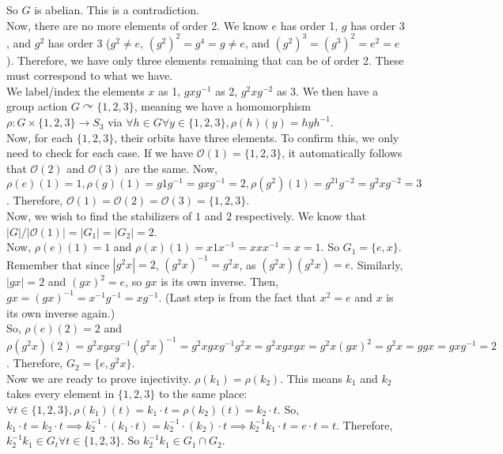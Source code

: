 \documentclass{amsart}
\begin{document}
\begin{enumerate}
\begin{enumerate}
    So $G$ is abelian. This is a contradiction.\\

    Now, there are no more elements of order 2. We know $e$ has order 1, $g$ has order $3$, and $g^2$ has order 3 ($g^2\neq e$, $(g^2)^2=g^4=g\neq e$, and $(g^2)^3=(g^3)^2=e^2=e$). Therefore, we have only three elements remaining that can be of order 2. These must correspond to what we have.\\

    We label/index the elements $x$ as 1, $gxg^{-1}$ as 2, $g^2xg^{-2}$ as 3. We then have a group action $G\curvearrowright\{1,2,3\}$, meaning we have a homomorphism $\rho:G\times\{1,2,3\}\to S_3$ via $\forall h\in G\forall y\in\{1,2,3\},\rho(h)(y)=hyh^{-1}$.\\

    Now, for each $\{1,2,3\}$, their orbits have three elements. To confirm this, we only need to check for each case. If we have $\mathcal{O}(1)=\{1,2,3\}$, it automatically follows that $\mathcal{O}(2)$ and $\mathcal{O}(3)$ are the same. Now, $\rho(e)(1)=1,\rho(g)(1)=g1g^{-1}=gxg^{-1}=2,\rho(g^2)(1)=g^21g^{-2}=g^2xg^{-2}=3$. Therefore, $\mathcal{O}(1)=\mathcal{O}(2)=\mathcal{O}(3)=\{1,2,3\}$.\\

    Now, we wish to find the stabilizers of $1$ and $2$ respectively. We know that $|G|/|\mathcal O(1)|=|G_1|=|G_2|=2$.\\

    Now, $\rho(e)(1)=1$ and $\rho(x)(1)=x1x^{-1}=xxx^{-1}=x=1$. So $G_1=\{e,x\}$.\\

    Remember that since $|g^2x|=2$, $(g^2x)^{-1}=g^2x$, as $(g^2x)(g^2x)=e$. Similarly, $|gx|=2$ and $(gx)^2=e$, so $gx$ is its own inverse. Then, $gx=(gx)^{-1}=x^{-1}g^{-1}=xg^{-1}$. (Last step is from the fact that $x^2=e$ and $x$ is its own inverse again.)\\
    
    So, $\rho(e)(2)=2$ and $\rho(g^2x)(2)=g^2xgxg^{-1}(g^2x)^{-1}=g^2xgxg^{-1}g^2x=g^2xgxgx=g^2x(gx)^2=g^2x=ggx=gxg^{-1}=2$. Therefore, $G_2=\{e,g^2x\}$.\\

    Now we are ready to prove injectivity. $\rho(k_1)=\rho(k_2)$. This means $k_1$ and $k_2$ takes every element in $\{1,2,3\}$ to the same place: $\forall t\in \{1,2,3\},\rho(k_1)(t)=k_1\cdot t=\rho(k_2)(t)=k_2\cdot t$. So, $k_1\cdot t=k_2\cdot t\implies k_2^{-1}\cdot(k_1\cdot t)=k_2^{-1}\cdot (k_2)\cdot t\implies k_2^{-1}k_1\cdot t=e\cdot t=t$. Therefore, $k_2^{-1}k_1\in G_t\forall t\in \{1,2,3\}$. So $k_2^{-1}k_1\in G_1\cap G_2$.\\
    

\end{enumerate}
\end{enumerate}
\end{document}
